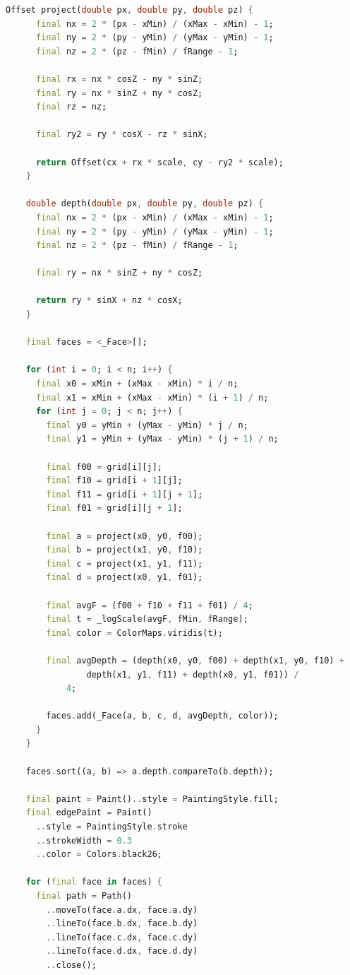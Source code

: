 \begin{lstlisting}[language=Dart, caption={Отрисовка 3D-поверхности, траектории поиска и найденного решения (mobile/lib/visualization/surface\_3d\_painter.dart)}, label={lst:surface-3d-painter-dart}]
    Offset project(double px, double py, double pz) {
      final nx = 2 * (px - xMin) / (xMax - xMin) - 1;
      final ny = 2 * (py - yMin) / (yMax - yMin) - 1;
      final nz = 2 * (pz - fMin) / fRange - 1;

      final rx = nx * cosZ - ny * sinZ;
      final ry = nx * sinZ + ny * cosZ;
      final rz = nz;

      final ry2 = ry * cosX - rz * sinX;

      return Offset(cx + rx * scale, cy - ry2 * scale);
    }

    double depth(double px, double py, double pz) {
      final nx = 2 * (px - xMin) / (xMax - xMin) - 1;
      final ny = 2 * (py - yMin) / (yMax - yMin) - 1;
      final nz = 2 * (pz - fMin) / fRange - 1;

      final ry = nx * sinZ + ny * cosZ;

      return ry * sinX + nz * cosX;
    }

    final faces = <_Face>[];

    for (int i = 0; i < n; i++) {
      final x0 = xMin + (xMax - xMin) * i / n;
      final x1 = xMin + (xMax - xMin) * (i + 1) / n;
      for (int j = 0; j < n; j++) {
        final y0 = yMin + (yMax - yMin) * j / n;
        final y1 = yMin + (yMax - yMin) * (j + 1) / n;

        final f00 = grid[i][j];
        final f10 = grid[i + 1][j];
        final f11 = grid[i + 1][j + 1];
        final f01 = grid[i][j + 1];

        final a = project(x0, y0, f00);
        final b = project(x1, y0, f10);
        final c = project(x1, y1, f11);
        final d = project(x0, y1, f01);

        final avgF = (f00 + f10 + f11 + f01) / 4;
        final t = _logScale(avgF, fMin, fRange);
        final color = ColorMaps.viridis(t);

        final avgDepth = (depth(x0, y0, f00) + depth(x1, y0, f10) +
                depth(x1, y1, f11) + depth(x0, y1, f01)) /
            4;

        faces.add(_Face(a, b, c, d, avgDepth, color));
      }
    }

    faces.sort((a, b) => a.depth.compareTo(b.depth));

    final paint = Paint()..style = PaintingStyle.fill;
    final edgePaint = Paint()
      ..style = PaintingStyle.stroke
      ..strokeWidth = 0.3
      ..color = Colors.black26;

    for (final face in faces) {
      final path = Path()
        ..moveTo(face.a.dx, face.a.dy)
        ..lineTo(face.b.dx, face.b.dy)
        ..lineTo(face.c.dx, face.c.dy)
        ..lineTo(face.d.dx, face.d.dy)
        ..close();


\end{lstlisting}
